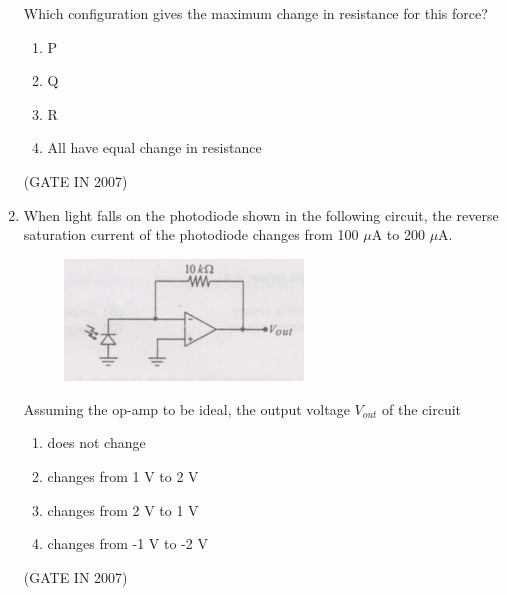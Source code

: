 \documentclass[journal]{IEEEtran}
\begin{document}
\begin{enumerate}
\begin{figure}[H]
\end{figure}
Which configuration gives the maximum change in resistance for this force?
\begin{enumerate}
\item P  
\item Q  
\item R  
\item All have equal change in resistance
\end{enumerate}
\hfill(GATE IN 2007)
\item When light falls on the photodiode shown in the following circuit, the reverse saturation current of the photodiode changes from 100 $\mu$A to 200 $\mu$A.  
\begin{figure}[H]
    \centering
      \includegraphics[width=0.6\textwidth]{3.jpg} 
      \caption{}
    \label{fig:fig3} 
\end{figure}
Assuming the op-amp to be ideal, the output voltage $V_{out}$ of the circuit
\begin{enumerate}
\item does not change  
\item changes from 1 V to 2 V  
\item changes from 2 V to 1 V  
\item changes from -1 V to -2 V
\end{enumerate}
\hfill(GATE IN 2007)


\end{enumerate}
\end{document}

